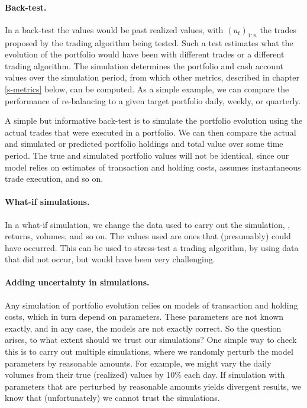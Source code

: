 \documentclass[openany]{now}
\begin{document}
\paragraph{Back-test.}
In a back-test the values would be past realized values,
with $(u_t)_{1:n}$ the trades proposed by the trading algorithm being
tested.  Such a test estimates what the evolution of the portfolio
would have been with different trades or a different trading algorithm.
The simulation determines the portfolio and cash account values
over the simulation period, from which other metrics, described in chapter
\ref{s-metrics}
below, can be computed.
As a simple example, we can compare the performance
of re-balancing to a given target portfolio daily, weekly, or quarterly.

A simple but informative back-test is to simulate the portfolio
evolution using the actual trades that were executed in a portfolio.
We can then compare the actual and simulated or predicted
portfolio holdings and total value over some time period.
The true and simulated portfolio values
will not be identical, since our model relies on
estimates of transaction and holding costs,
assumes instantaneous trade execution, and so on.

\paragraph{What-if simulations.}
In a what-if simulation, we change the data used to carry out the
simulation, \ie, returns, volumes, and so on.
The values used are ones that (presumably) could have occurred.
This can be used to stress-test a trading algorithm, by using data
that did not occur, but would have been very challenging.

\paragraph{Adding uncertainty in simulations.}
Any simulation of portfolio evolution relies on models of
transaction and holding costs, which in turn depend on parameters.
These parameters are not known exactly, and in any case,
the models are not exactly correct.
So the question arises, to what extent should we trust our simulations?
One simple way to check this is to carry out multiple simulations,
where we randomly perturb the model parameters by reasonable
amounts.  For example, we might vary the daily volumes
from their true (realized) values by 10\% each day.  If
simulation with parameters that are perturbed by reasonable amounts
yields divergent results, we know that (unfortunately) we cannot
trust the simulations.
\end{document}
